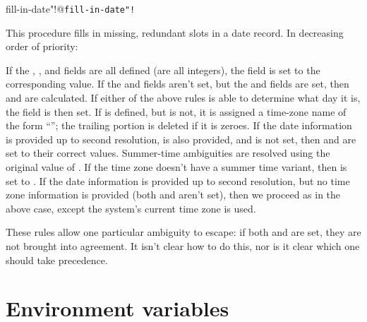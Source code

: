         {fill-in-date"!@\texttt{fill-in-date"!}}
\begin{desc}
This procedure fills in missing, redundant slots in a date record.
In decreasing order of priority:
\begin{itemize}
      If the , , and  fields are all
      defined (are all integers), the 
      field is set to the corresponding value.
      If the  and  fields aren't set, but
      the  and  fields are set, then
       and  are calculated.
      If either of the above rules is able to determine what day it is,
      the  field is then set.
      If  is defined, but  is not, it is assigned
      a time-zone name of the form ``''; 
      the trailing  portion is deleted if it 
      is zeroes.
      If the date information is provided up to second resolution,
       is also provided, and  is not set,
      then  and  are set to their correct values. 
      Summer-time ambiguities are resolved using the original value of
      . If the time zone doesn't have a
      summer time variant, then  is set to .
      If the date information is provided up to second resolution,
      but no time zone information is provided (both  and
       aren't set), then we proceed as in the above case,
      except the system's current time zone is used.
\end{itemize}
These rules allow one particular ambiguity to escape:
if both  and  are set, they are not brought
into agreement. It isn't clear how to do this, nor is it clear which
one should take precedence.


\end{desc}


\section{Environment variables}

